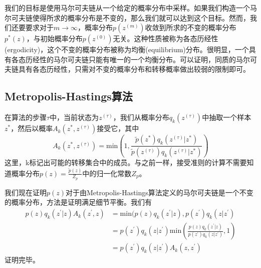 我们的目标是使用马尔可夫链从一个给定的概率分布中采样。如果我们构造一个马尔可夫链使得所求的概率分布是不变的，那么我们就可以达到这个目标。然而，我们还要要求对于$m\to \infty$，概率分布$p(z^{(m)})$收敛到所求的不变的概率分布$p^*(z)$，与初始概率分布$p(z^{(0)})$无关。这种性质被称为各态历经性(ergodicity)，这个不变的概率分布被称为均衡(equilibrium)分布。很明显，一个具有各态历经性的马尔可夫链只能有唯一的一个均衡分布。可以证明，同质的马尔可夫链具有各态历经性，只需对不变的概率分布和转移概率做出较弱的限制即可。


\subsection*{Metropolis-Hastings算法}
在算法的步骤$\tau$中，当前状态为$z^{(\tau)}$，我们从概率分布$q_k(z^{(\tau)})$中抽取一个样本$z^*$，然后以概率$A_k(z^*,z^{(\tau)})$接受它，其中
\begin{equation}
	A_k(z^*,z^{(\tau)})=\mathrm{min}\left(1,\frac{\tilde{p}(z^*)q_k(z^{(\tau)}|z^*)}{\tilde{p}(z^{(\tau)})q_k(z^{(\tau)}|z^*)} \right) 
\end{equation}
这里，k标记出可能的转移集合中的成员。与之前一样，接受准则的计算不需要知道概率分布$p(z)=\frac{\tilde{p}(z)}{Z_p}$中的归一化常数$Z_p$。

我们现在证明$p(z)$对于由Metropolis-Hastings算法定义的马尔可夫链是一个不变的概率分布，方法是证明满足细节平衡。我们有
\begin{equation}
	\begin{aligned}
		p(z)q_k(z^{'}|z)A_k(z^{'},z)&=\mathrm{min}(p(z)q_k(z^{'}|z),p(z^{'})q_k(z|z^{'})\\
		&=p(z^{'})q_k(z|z^{'})\mathrm{min}(\frac{p(z)q_k(z^{'}|z)}{p(z^{'})q_k(z|z^{'})},1)\\
		&=p(z^{'})q_k(z|z^{'})A_k(z,z^{'})
	\end{aligned}
\end{equation}
证明完毕。

